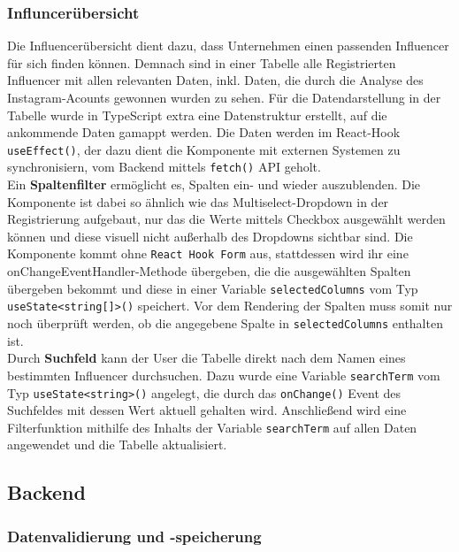 \documentclass[conference,a4paper,flushend]{cs-techrep}
\begin{document}
\subsubsection{Influncerübersicht\\}
Die Influencerübersicht dient dazu, dass Unternehmen einen passenden Influencer für sich finden können. Demnach sind in einer Tabelle alle Registrierten Influencer mit allen relevanten Daten, inkl. Daten, die durch die Analyse des Instagram-Acounts gewonnen wurden zu sehen. 
Für die Datendarstellung in der Tabelle wurde in TypeScript extra eine Datenstruktur erstellt, auf die ankommende Daten gamappt werden. Die Daten werden im React-Hook \texttt{useEffect()}, der dazu dient die Komponente mit externen Systemen zu synchronisiern, vom Backend mittels \texttt{fetch()} API geholt.
\\
Ein \textbf{Spaltenfilter} ermöglicht es, Spalten ein- und wieder auszublenden. Die Komponente ist dabei so ähnlich wie das Multiselect-Dropdown in der Registrierung aufgebaut, nur das die Werte mittels Checkbox ausgewählt werden können und diese visuell nicht außerhalb des Dropdowns sichtbar sind. Die Komponente kommt ohne \texttt{React Hook Form} aus, stattdessen wird ihr eine onChangeEventHandler-Methode übergeben, die die ausgewählten Spalten übergeben bekommt und diese in einer Variable \texttt{selectedColumns} vom Typ \texttt{useState<string[]>()} speichert. Vor dem Rendering der Spalten muss somit nur noch überprüft werden, ob die angegebene Spalte in \texttt{selectedColumns} enthalten ist. 
\\
Durch \textbf{Suchfeld} kann der User die Tabelle direkt nach dem Namen eines bestimmten Influencer durchsuchen. Dazu wurde eine Variable \texttt{searchTerm} vom Typ \texttt{useState<string>()} angelegt, die durch das \texttt{onChange()} Event des Suchfeldes mit dessen Wert aktuell gehalten wird. Anschließend wird eine Filterfunktion mithilfe des Inhalts der Variable \texttt{searchTerm} auf allen Daten angewendet und die Tabelle aktualisiert.


\subsection{Backend}

\subsubsection{Datenvalidierung und -speicherung}
\end{document}
